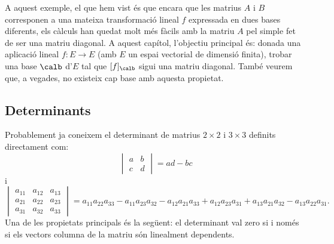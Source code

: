 A aquest exemple, el que hem vist és que encara que les matrius $A$ i $B$ corresponen a una mateixa transformació lineal $f$ expressada en dues bases diferents, els càlculs han quedat molt més fàcils amb la matriu $A$ pel simple fet de ser una matriu diagonal. A aquest capítol, l'objectiu principal és: donada una aplicació lineal $f\colon E \to E$ (amb $E$ un espai vectorial de dimensió finita), trobar una base $\calb$ d'$E$ tal que $[f]_\calb$ sigui una matriu diagonal. També veurem que, a vegades, no existeix cap base amb aquesta propietat.

\subsection{Determinants}
Probablement ja coneixem el determinant de matrius $2\times 2$ i $3\times 3$ definits directament com:
\begin{equation}\label{eq:det2}
\begin{vmatrix}
a & b \\ c & d  
\end{vmatrix}= ad -bc
\end{equation}
i
\begin{equation}\label{eq:det3}
\begin{vmatrix}
a_{11} & a_{12} & a_{13}\\
a_{21} & a_{22} & a_{23}\\
a_{31} & a_{32} & a_{33}
\end{vmatrix} = a_{11}a_{22}a_{33}-a_{11}a_{23}a_{32}-a_{12}a_{21}a_{33}+a_{12}a_{23}a_{31}+a_{13}a_{21}a_{32}-a_{13}a_{22}a_{31}.
\end{equation}
Una de les propietats principals és la següent: el determinant val zero si i només si els vectors columna de la matriu són linealment dependents.

